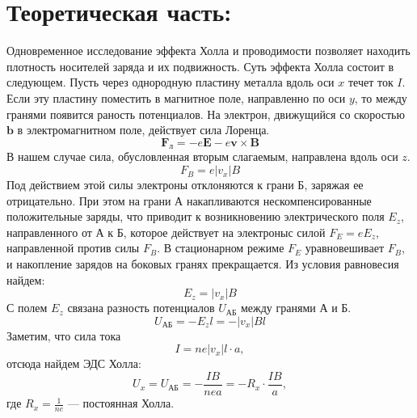 \documentclass[a4paper, fontsize=14pt]{article}
\begin{document}
\section*{Теоретическая часть:}
	Одновременное исследование эффекта Холла и проводимости позволяет находить плотность носителей заряда и их подвижность. Суть эффекта Холла состоит в следующем. Пусть через однородную пластину металла вдоль оси $x$ течет ток $I$. Если эту пластину поместить в магнитное поле, направленно по оси $y$, то между гранями появится раность потенциалов. На электрон, движущийся со скоростью $\mathbf{b}$ в электромагнитном поле, действует сила Лоренца.
		\begin{equation}
			\mathbf{F_\text{л}} = -e\mathbf{E} - e\mathbf{v} \times \mathbf{B}
		\end{equation}
		В нашем случае сила, обусловленная вторым слагаемым, направлена вдоль оси $z$.
		\begin{equation}
			F_B = e\left|v_x\right|B
		\end{equation}
		Под действием этой силы электроны отклоняются к грани Б, заряжая ее отрицательно. При этом на грани А накапливаются нескомпенсированные положительные заряды, что приводит к возникновению электрического поля $E_z$, направленного от А к Б, которое действует на электроныс силой $F_E = eE_z$, направленной против силы $F_B$.  В стационарном режиме $F_E$ уравновешивает $F_B$, и накопление зарядов на боковых гранях прекращается. Из условия равновесия найдем:
		\begin{equation}
			E_z = \left|v_x\right|B
		\end{equation}
		С полем $E_z$ связана разность потенциалов $U_{\text{АБ}}$ между гранями А и Б.
		\begin{equation}
			U_{\text{АБ}} = - E_zl = - \left|v_x\right|Bl
		\end{equation}
		Заметим, что сила тока
		\begin{equation}
			I = ne\left|v_x\right|l\cdot a,
		\end{equation}
		отсюда найдем ЭДС Холла:
		\begin{equation}
			U_x = U_{\text{АБ}} = -\frac{IB}{nea} = -R_x\cdot\frac{IB}{a},
		\end{equation}
		где $R_x = \frac{1}{n e}$ --- постоянная Холла.
\end{document}
